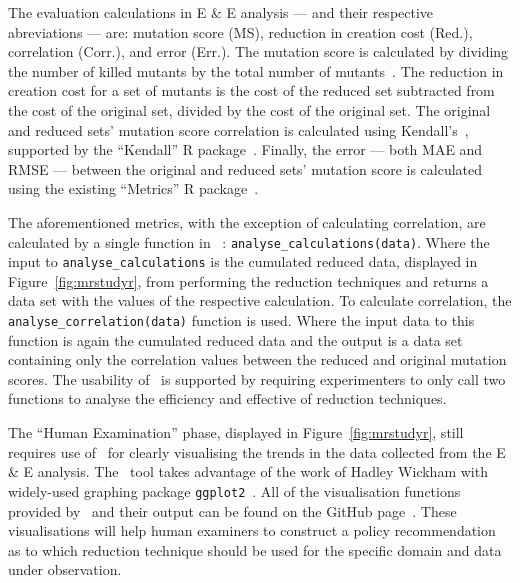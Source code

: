 The evaluation calculations in E \& E analysis --- and their respective abreviations --- are: mutation score
(MS), reduction in creation cost (Red.), correlation (Corr.), and error (Err.). The mutation score is calculated
by dividing the number of killed mutants by the total number of mutants~\cite{wong1995reducing}. The reduction
in creation cost for a set of mutants is the cost of the reduced set subtracted from the cost of the original set,
divided by the cost of the original set. The original and reduced sets' mutation score correlation is calculated
using Kendall's~\taub, supported by the ``Kendall'' R package~\cite{mcleod2015kendall}. Finally, the error --- both
MAE and RMSE --- between the original and reduced sets' mutation score is calculated using the existing ``Metrics''
R package~\cite{metrics}.

The aforementioned metrics, with the exception of calculating correlation, are calculated by a single function
in \mr~: \texttt{analyse\_calculations(data)}. Where the input to \texttt{analyse\_calculations} is the cumulated
reduced data, displayed in Figure~\ref{fig:mrstudyr}, from performing the reduction techniques and returns a data
set with the values of the respective calculation. To calculate correlation, the \texttt{analyse\_correlation(data)}
function is used. Where the input data to this function is again the cumulated reduced data and the output is a
data set containing only the correlation values between the reduced and original mutation scores. The usability of
\mr~is supported by requiring experimenters to only call two functions to analyse the efficiency and effective of
reduction techniques.


The ``Human Examination'' phase, displayed in Figure~\ref{fig:mrstudyr}, still requires use of \mr~for clearly
visualising the trends in the data collected from the E \& E analysis. The \mr~tool takes advantage of the work
of Hadley Wickham with widely-used graphing package \texttt{ggplot2}~\cite{ggplot2}. All of the visualisation
functions provided by \mr~and their output can be found on the GitHub page~\cite{tool}. These visualisations
will help human examiners to construct a policy recommendation as to which reduction technique should be used
for the specific domain and data under observation.


